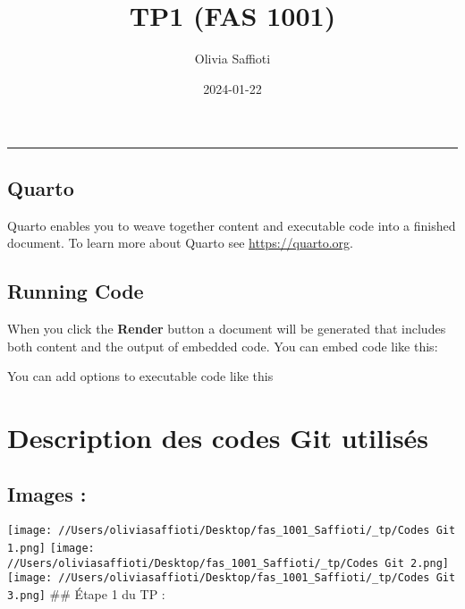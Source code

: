 \documentclass[
  letterpaper,
  DIV=11,
  numbers=noendperiod]{scrartcl}
\title{TP1 (FAS 1001)}
\author{Olivia Saffioti}
\date{2024-01-22}
\begin{document}
\maketitle
\ifdefined\Shaded\renewenvironment{Shaded}{\begin{tcolorbox}[sharp corners, interior hidden, boxrule=0pt, frame hidden, borderline west={3pt}{0pt}{shadecolor}, enhanced, breakable]}{\end{tcolorbox}}\fi

\begin{center}\rule{0.5\linewidth}{0.5pt}\end{center}

\hypertarget{quarto}{%
\subsection{Quarto}\label{quarto}}

Quarto enables you to weave together content and executable code into a
finished document. To learn more about Quarto see
\url{https://quarto.org}.

\hypertarget{running-code}{%
\subsection{Running Code}\label{running-code}}

When you click the \textbf{Render} button a document will be generated
that includes both content and the output of embedded code. You can
embed code like this:

You can add options to executable code like this

\hypertarget{description-des-codes-git-utilisuxe9s}{%
\section{Description des codes Git
utilisés}\label{description-des-codes-git-utilisuxe9s}}

\hypertarget{images}{%
\subsection{Images :}\label{images}}

\texttt{[image: //Users/oliviasaffioti/Desktop/fas\_1001\_Saffioti/\_tp/Codes Git 1.png]}
\texttt{[image: //Users/oliviasaffioti/Desktop/fas\_1001\_Saffioti/\_tp/Codes Git 2.png]}
\texttt{[image: //Users/oliviasaffioti/Desktop/fas\_1001\_Saffioti/\_tp/Codes Git 3.png]}
\#\# Étape 1 du TP :
\end{document}
